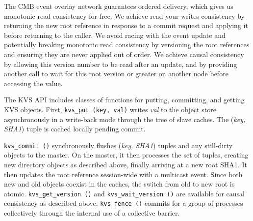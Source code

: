 The CMB event overlay network guarantees ordered delivery, which gives
us monotonic read consistency for free.  We achieve read-your-writes
consistency by returning the new root reference in response to a commit
request and applying it before returning to the caller.  We avoid
racing with the event update and potentially breaking monotonic read
consistency by versioning the root references and ensuring they are
never applied out of order.
We achieve causal consistency by allowing this version number
to be read after an update, and by providing another call to wait for this
root version or greater on another node before accessing the value.

The KVS API includes classes of functions for putting, committing, and
getting KVS objects.  
First, {\tt kvs\_put (key, val)}
writes {\em val} to the object store asynchronously in a write-back
mode through the tree of slave caches.
The ({\em key, SHA1}) tuple is cached locally pending commit.

{\tt kvs\_commit ()} synchronously flushes ({\em key, SHA1}) tuples
and any still-dirty objects to the master.  On the master, it then
processes the set of tuples, creating new directory objects as described
above, finally arriving at a new root SHA1.  It then updates the 
root reference session-wide with a multicast event.
Since both new and old objects coexist in the caches, the switch from old
to new root is atomic.
{\tt kvs\_get\_version ()} and {\tt kvs\_wait\_version ()} are available
for causal consistency as described above.
{\tt kvs\_fence ()} commits for a group of processes collectively
through the internal use of a collective barrier.


